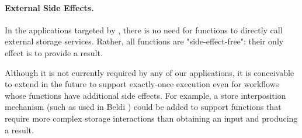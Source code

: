 \paragraph{External Side Effects.} In the applications targeted by \name{},
there is no need for functions to directly call external storage services.
Rather, all functions are "side-effect-free": their only effect is to provide
a result. 


Although it is not currently required by any of our applications, it is
conceivable to extend \name{} in the future to support exactly-once execution even for workflows whose
functions have additional side effects. For example, a store interposition
mechanism (such as used in Beldi \cite{beldi}) could be added to support
functions that require more complex storage interactions than obtaining an
input and producing a result.